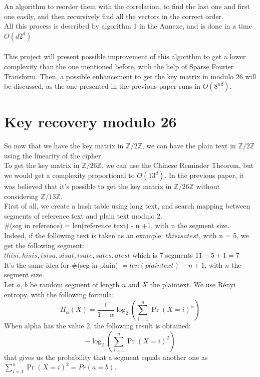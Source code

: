 \documentclass{article}
\begin{document}
An algorithm to reorder them with the correlation, to find the last one and first one easily, and then recursively find all the vectors in the correct order.\\
All this process is described by algorithm 1 in the Annexe, and is done in a time $O(d 2^d)$\\
\\
This project will present possible improvement of this algorithm to get a lower complexity than the one mentioned before, with the help of Sparse Fourier Transform. Then, a possible enhancement to get the key matrix in modulo 26 will be discussed, as the one presented in the previous paper runs in $O(8^{nd})$.\\


\section{Key recovery modulo 26}
So now that we have the key matrix in $\mathbb{Z}/2\mathbb{Z}$, we can have the plain text in $\mathbb{Z}/2\mathbb{Z}$ using the linearity of the cipher.\\
To get the key matrix in $\mathbb{Z}/26\mathbb{Z}$, we can use the Chinese Reminder Theorem, but we would get a complexity proportional to $O(13^d)$. In the previous paper, it was believed that it's possible to get the key matrix in $\mathbb{Z}/26\mathbb{Z}$ without considering $\mathbb{Z}/13\mathbb{Z}$.\\
First of all, we create a hash table using long text, and search mapping between segments of reference text and plain text modulo 2.\\
\#(seg in reference) = len(reference text) - n +1, with n the segment size.\\
Indeed, if the following text is taken as an example: $thisisatest$, with n = 5, we get the following segment:\\
 $ thisi, hisis, isisa, sisat, isate, sates, atest $ which is 7 segments $ 11 - 5 + 1 = 7 $\\
It's the same idea for \#(seg in plain) $= len(plain text) - n +1$, with $n$ the segment size.\\
Let $a$, $b$ be random segment of length $n$ and $X$ the plaintext. We use R\'enyi entropy, with the following formula:\\
$$H_{\alpha}(X) = \frac{1}{1-\alpha}\log_{2}(\sum_{i=1}^{n}{\Pr(X=i)^{\alpha}})$$ 
When alpha has the value 2, the following result is obtained:
$$-\log_{2}(\sum_{i=1}^{n}{\Pr(X=i)^{2}})$$ that gives us the probability that a segment equals another one as $\sum_{i=1}^{n}{\Pr(X=i)^{2}} =Pr(a=b)$.\\
\end{document}
